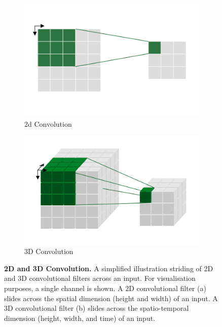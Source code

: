 \documentclass[a4paper]{article}
\begin{document}
\begin{figure}
  \centering
  \begin{subfigure}[b]{0.49\textwidth}
    \includegraphics[width=\textwidth]{./figures/2d-conv.png}
    \caption{2d Convolution}
  \end{subfigure}
  \hfill
  \begin{subfigure}[b]{0.49\textwidth}
    \includegraphics[width=\textwidth]{./figures/3d-conv.png}
    \caption{3D Convolution}
  \end{subfigure}
  \caption{
  \textbf{2D and 3D Convolution.} A simplified illustration striding of 2D and
  3D convolutional filters across an input. For visualisation purposes, a single
  channel is shown. A 2D convolutional filter (a) slides across the spatial
  dimension (height and width) of an input. A 3D convolutional filter (b) slides
across the spatio-temporal dimension (height, width, and time) of an input.}
  \label{fig:conv}
\end{figure}
\end{document}
